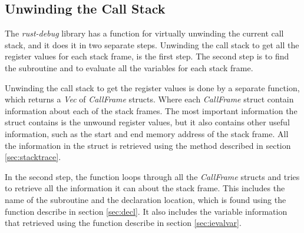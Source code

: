 %
%
%
%


\subsection{Unwinding the Call Stack}

The \emph{rust-debug} library has a function for virtually unwinding the current call stack, and it does it in two separate steps.
Unwinding the call stack to get all the register values for each stack frame, is the first step.
The second step is to find the subroutine and to evaluate all the variables for each stack frame.


Unwinding the call stack to get the register values is done by a separate function, which returns a \emph{Vec} of \emph{CallFrame} structs.
Where each \emph{CallFrame} struct contain information about each of the stack frames.
The most important information the struct contains is the unwound register values, but it also contains other useful information, such as the start and end memory address of the stack frame.
All the information in the struct is retrieved using the method described in section \ref{sec:stacktrace}.


In the second step, the function loops through all the \emph{CallFrame} structs and tries to retrieve all the information it can about the stack frame.
This includes the name of the subroutine and the declaration location, which is found using the function describe in section \ref{sec:decl}.
It also includes the variable information that retrieved using the function describe in section \ref{sec:ievalvar}.



